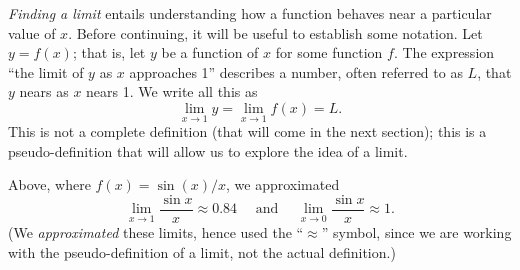 \emph{Finding a limit} entails understanding how a function behaves near a particular value of $x$. Before continuing, it will be useful to establish some notation. Let $y=f(x)$; that is, let $y$ be a function of $x$ for some function $f$. The expression ``the limit of $y$ as $x$ approaches 1'' describes a number, often referred to as $L$, that $y$ nears as $x$ nears 1. We write all this as
\[\lim_{x\to 1} y = \lim_{x\to 1} f(x) = L.\]
This is not a complete definition (that will come in the next section); this is a pseudo-definition that will allow us to explore the idea of a limit. 

Above, where $f(x) = \sin(x)/x$, we approximated
\[\lim_{x\to 1} \frac{\sin x}{x} \approx 0.84 \quad \text{ and } \quad \lim_{x\to 0}\frac{\sin x}{x} \approx 1.\]
(We \textit{approximated} these limits, hence used the ``$\approx$'' symbol, since we are working with the pseudo-definition of a limit, not the actual definition.)


